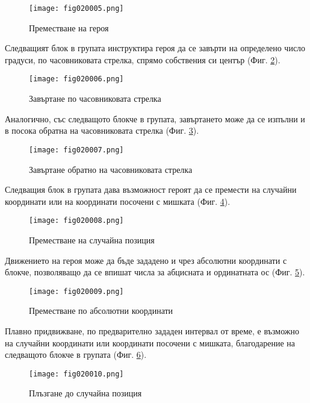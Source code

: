 \begin{figure}[H]
  \centering
  \texttt{[image: fig020005.png]}
  \caption{Преместване на героя}
\label{fig020005}
\end{figure}

Следващият блок в групата инструктира героя да се завърти на определено число градуси, по часовниковата стрелка, спрямо собствения си център (Фиг. \ref{fig020006}).

\begin{figure}[H]
  \centering
  \texttt{[image: fig020006.png]}
  \caption{Завъртане по часовниковата стрелка}
\label{fig020006}
\end{figure}

Аналогично, със следващото блокче в групата, завъртането може да се изпълни и в посока обратна на часовниковата стрелка (Фиг. \ref{fig020007}).

\begin{figure}[H]
  \centering
  \texttt{[image: fig020007.png]}
  \caption{Завъртане обратно на часовниковата стрелка}
\label{fig020007}
\end{figure}

Следващия блок в групата дава възможност героят да се премести на случайни координати или на координати посочени с мишката (Фиг. \ref{fig020008}).

\begin{figure}[H]
  \centering
  \texttt{[image: fig020008.png]}
  \caption{Преместване на случайна позиция}
\label{fig020008}
\end{figure}

Движението на героя може да бъде зададено и чрез абсолютни координати с блокче, позволяващо да се впишат числа за абцисната и ординатната ос (Фиг. \ref{fig020009}).

\begin{figure}[H]
  \centering
  \texttt{[image: fig020009.png]}
  \caption{Преместване по абсолютни координати}
\label{fig020009}
\end{figure}

Плавно придвижване, по предварително зададен интервал от време, е възможно на случайни координати или координати посочени с мишката, благодарение на следващото блокче в групата (Фиг. \ref{fig020010}).

\begin{figure}[H]
  \centering
  \texttt{[image: fig020010.png]}
  \caption{Плъзгане до случайна позиция}
\label{fig020010}
\end{figure}

